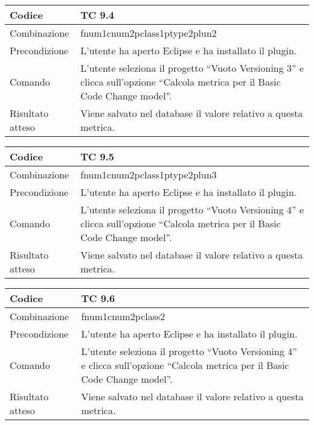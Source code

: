 \begin{table}[ht]
\begin{tabular}{|p{3cm}|p{9cm}|}
\hline
\cellcolor{lightgray}Codice				& TC 9.4								\\
\hline
\cellcolor{lightgray}Combinazione		& fnum1cnum2pclass1ptype2plun2									\\
\hline
\cellcolor{lightgray}Precondizione		& L'utente ha aperto Eclipse e ha installato il plugin.		\\
\hline
\cellcolor{lightgray}Comando			& L'utente seleziona il progetto ``Vuoto Versioning 3''  e clicca sull'opzione ``Calcola metrica per il Basic Code Change model''.	\\
\hline
\cellcolor{lightgray}Risultato atteso	& Viene salvato nel database il valore relativo a questa metrica.\\
\hline
\end{tabular}
\end{table}


\begin{table}[ht]
\begin{tabular}{|p{3cm}|p{9cm}|}
\hline
\cellcolor{lightgray}Codice				& TC 9.5								\\
\hline
\cellcolor{lightgray}Combinazione		& fnum1cnum2pclass1ptype2plun3									\\
\hline
\cellcolor{lightgray}Precondizione		& L'utente ha aperto Eclipse e ha installato il plugin.		\\
\hline
\cellcolor{lightgray}Comando			& L'utente seleziona il progetto ``Vuoto Versioning 4''  e clicca sull'opzione ``Calcola metrica per il Basic Code Change model''.	\\
\hline
\cellcolor{lightgray}Risultato atteso	& Viene salvato nel database il valore relativo a questa metrica.\\
\hline
\end{tabular}
\end{table}


\begin{table}[ht]
\begin{tabular}{|p{3cm}|p{9cm}|}
\hline
\cellcolor{lightgray}Codice				& TC 9.6								\\
\hline
\cellcolor{lightgray}Combinazione		& fnum1cnum2pclass2									\\
\hline
\cellcolor{lightgray}Precondizione		& L'utente ha aperto Eclipse e ha installato il plugin.		\\
\hline
\cellcolor{lightgray}Comando			& L'utente seleziona il progetto ``Vuoto Versioning 4''  e clicca sull'opzione ``Calcola metrica per il Basic Code Change model''.	\\
\hline
\cellcolor{lightgray}Risultato atteso	& Viene salvato nel database il valore relativo a questa metrica.\\
\hline
\end{tabular}
\end{table}

